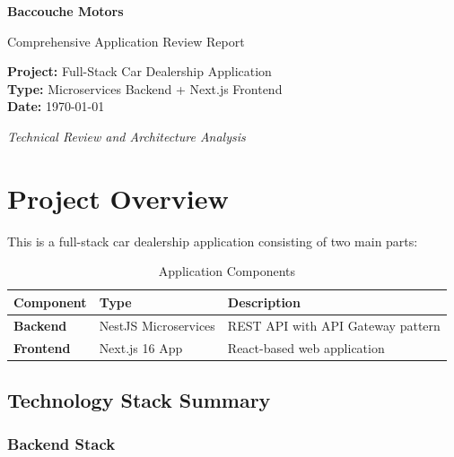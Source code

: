 \documentclass[12pt,a4paper]{article}
\begin{document}
\begin{titlepage}
    \centering
    \vspace*{3cm}
    
    {\Huge\bfseries Baccouche Motors\par}
    \vspace{1cm}
    {\Large Comprehensive Application Review Report\par}
    \vspace{2cm}
    
    \textbf{Project:} Full-Stack Car Dealership Application \\
    \textbf{Type:} Microservices Backend + Next.js Frontend \\
    \textbf{Date:} \today \\
    
    \vspace{3cm}
    
    \textit{Technical Review and Architecture Analysis}
    
\end{titlepage}

\newpage
\tableofcontents
\newpage

\section{Project Overview}
\label{sec:overview}

This is a full-stack car dealership application consisting of two main parts:

\begin{table}[h]
\centering
\caption{Application Components}
\begin{tabular}{@{}lll@{}}
\toprule
Component & Type & Description \\
\midrule
\textbf{Backend} & NestJS Microservices & REST API with API Gateway pattern \\
\textbf{Frontend} & Next.js 16 App & React-based web application \\
\bottomrule
\end{tabular}
\end{table}

\subsection{Technology Stack Summary}

\subsubsection{Backend Stack}
\end{document}
